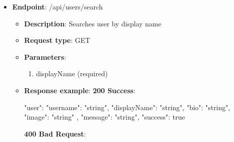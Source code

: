 \begin{itemize}
\begin{itemize}
        \begin{spverbatim}
        {
            "user": {
            "username": "string",
            "displayName": "string",
            "bio": "string",
            "image": "string"
        },
            "message": "string",
            "success": true
        }
        \end{spverbatim}
        \textbf{400 Bad Request}:
        \begin{spverbatim}
        {
            "errorMessage": "string",
            "errorDetails": "string",
            "statusCode": 0,
            "success": true
        }
        \end{spverbatim}
        \textbf{409 Conflict}:
        \begin{spverbatim}
        {
            "errorMessage": "string",
            "errorDetails": "string",
            "statusCode": 0,
            "success": true
        }
        \end{spverbatim}
        \item \textbf{Response messages}:
        \begin{enumerate}
            \item Success.
            \item User not found.
        \end{enumerate}
    \end{itemize}
    \item \textbf{Endpoint}: /api/users/search
    \begin{itemize}
        \item \textbf{Description}: Searches user by display name
        \item \textbf{Request type}: GET
        \item \textbf{Parameters}:
        \begin{enumerate}
            \item displayName (required)
        \end{enumerate}
        \item \textbf{Response example}:
        \textbf{200 Success}:
        \begin{spverbatim}
        {
            "user": {
            "username": "string",
            "displayName": "string",
            "bio": "string",
            "image": "string"
        },
            "message": "string",
            "success": true
        }
        \end{spverbatim}
        \textbf{400 Bad Request}:

\end{itemize}
\end{itemize}
